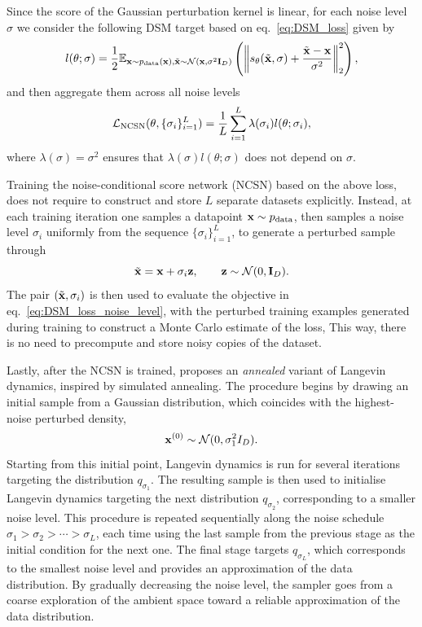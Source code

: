 Since the score of the Gaussian perturbation kernel is linear, for each noise level $\sigma$ we consider the following DSM target based on eq.~\eqref{eq:DSM_loss} given by 
\begin{equation}
    \label{eq:DSM_loss_noise_level}
    l(\theta;\sigma) = 
    \frac12 \mathbb{E}_{{ \mathbf{x}}\sim p_{\mathrm{data}}({ \mathbf{x}}), \tilde{{ \mathbf{x}}}\sim {\mathcal N}({ \mathbf{x}},\sigma^2{\mathbf I}_D)}
    \left(\left\|
        s_\theta(\tilde{{ \mathbf{x}}},\sigma) + \frac{\tilde{{ \mathbf{x}}} - { \mathbf{x}}}{\sigma^2}
    \right\|^2_2\right),
\end{equation}
and then aggregate them across all noise levels
\begin{equation}
    {\mathcal L}_{\text{NCSN}}(\theta, \{\sigma_i\}_{i=1}^L) = \frac1L \sum_{i=1}^{L} \lambda(\sigma_i) l(\theta;\sigma_i),
\end{equation}
where $\lambda(\sigma) = \sigma^2$  ensures that $ \lambda(\sigma) l(\theta;\sigma)$ does not depend on $\sigma$.

\begin{remark}
    Training the noise-conditional score network (NCSN) based on the above loss, does not require to construct and store $L$ separate datasets explicitly. Instead, at each training iteration one samples a datapoint ${ \mathbf{x}}\sim p_{\mathrm{data}}$, then samples a noise level $\sigma_i$ uniformly from the sequence $\{\sigma_i\}_{i=1}^L$, to generate a perturbed sample through
    \[
    \tilde{{ \mathbf{x}}} = { \mathbf{x}} + \sigma_i { \mathbf{z}}, \qquad { \mathbf{z}} \sim {\mathcal N}(0,{\mathbf I}_D).
    \]
    The pair $(\tilde{{ \mathbf{x}}},\sigma_i)$ is then used to evaluate the objective in eq.~\eqref{eq:DSM_loss_noise_level}, with the perturbed training examples generated during training to construct a Monte Carlo estimate of the loss, This way, there is no need to precompute and store noisy copies of the dataset.
\end{remark}



Lastly, after the NCSN is trained, \cite{song2021scorebased} proposes an \emph{annealed} variant of Langevin dynamics, inspired by simulated annealing. The procedure begins by drawing an initial sample from a Gaussian distribution, which coincides with the highest-noise perturbed density,
\[
{ \mathbf{x}}^{(0)} \sim \mathcal N(0,\sigma_1^2 I_D).
\]
Starting from this initial point, Langevin dynamics is run for several iterations targeting the distribution \(q_{\sigma_1}\). The resulting sample is then used to initialise Langevin dynamics targeting the next distribution \(q_{\sigma_2}\), corresponding to a smaller noise level. This procedure is repeated sequentially along the noise schedule \(\sigma_1 > \sigma_2 > \cdots > \sigma_L\), each time using the last sample from the previous stage as the initial condition for the next one. The final stage targets \(q_{\sigma_L}\), which corresponds to the smallest noise level and provides an approximation of the data distribution. By gradually decreasing the noise level, the sampler goes from a coarse exploration of the ambient space toward a reliable approximation of the data distribution.


